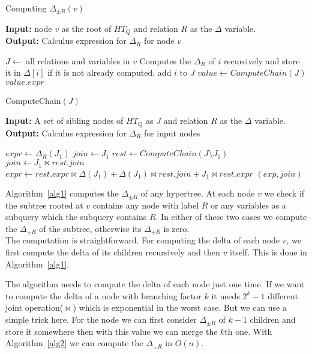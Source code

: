 \documentclass[12pt]{article}
\begin{document}
\begin{algorithm}[H]
\caption{Computing $\Delta_{\pm R}(v)$} 
\label{alg1}
\textbf{Input:} node $v$ as the root of $HT_{Q}$ and relation $R$ as the $\Delta$ variable.\\
\textbf{Output:} Calculus expression for $\Delta_{R}$ for node $v$
\begin{algorithmic}[1]
\STATE $J\gets $ all relations and variables in $v$
\STATE Computes the $\Delta_{R}$ of $i$ recursively and store it in $\Delta[i]$ if it is not already computed.
\STATE add $i$ to $J$
\ENDIF
\ENDFOR
\STATE $value\gets ComputeChain(J)$
\RETURN $value.expr$
\end{algorithmic}
\end{algorithm}

\begin{algorithm}[H]
\caption{ComputeChain$(J)$} 
\label{alg2}
\textbf{Input:} A set of sibling nodes of $HT_{Q}$ as $J$ and relation $R$ as the $\Delta$ variable.\\
\textbf{Output:} Calculus expression for $\Delta_{R}$ for input nodes\\
\begin{algorithmic}[1]
\STATE $expr\gets \Delta_{R}(J_{1})$ 
\STATE $join\gets J_{1}$
\ELSE
\STATE $rest\gets ComputeChain(J\setminus J_{1})$
\STATE $join\gets J_{1}\Join rest.join$
\STATE $expr\gets rest.expr\Join \Delta(J_{1})+\Delta(J_{1})\Join rest.join+J_{1}\Join rest.expr$
\ENDIF
\RETURN $(exp,join)$
\end{algorithmic}
\end{algorithm}
Algorithm~\ref{alg1} computes the $\Delta_{\pm R}$ of any hypertree. At each node $v$ we check if the subtree rooted at $v$ contains any node with label $R$ or any variables as a subquery which the subquery contains $R$. In either of these two cases we compute the $\Delta_{\pm R}$ of the subtree, otherwise its $\Delta_{\pm R}$ is zero. \\
The computation is straightforward. For computing the delta of each node $v$, we first compute the delta of its children recursively  and then $v$ itself. This is done in Algorithm~\ref{alg1}. 
\par
The algorithm needs to compute the delta of each node just one time. If we want to compute the delta of a node with branching factor $k$ it needs $2^{k}-1$ different joint operation($\Join$) which is exponential in the worst case. But we can use a simple trick here. For the node we can first consider $\Delta_{\pm R}$ of $k-1$ children and store it somewhere then with this value we can merge the $k$th one. With Algorithm~\ref{alg2} we can compute the $\Delta_{\pm R}$ in $O(n)$.
\end{document}
